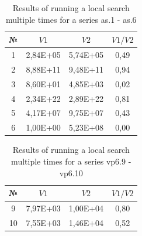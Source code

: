 \documentclass{ifacconf}
\begin{document}
\begin{table}[ht]
	\centering
	\begin{tabular}{|c|c|c|c|}
		\hline
		\hspace*{1.5mm}№\hspace*{0.1mm} &
		\hspace*{1.5cm}$V1$\hspace*{0.1cm}&
		\hspace*{1.5cm}$V2$\hspace*{0.1cm}&
		\hspace*{0.5cm}$V1/V2$\hspace*{0.1cm}\\
		\hline
		1 &  2,84E+05  &  5,74E+05 &   0,49\\
		2 &  8,88E+11  &  9,48E+11 &   0,94\\
		3 &  8,60E+01  &  4,85E+03 &   0,02\\
		4 &  2,34E+22  &  2,89E+22 &   0,81\\
		5 &  4,17E+07  &  9,75E+07 &   0,43\\
		6 &  1,00E+00  &  5,23E+08 &   0,00\\
		\hline
	\end{tabular}
	\caption{Results of running a local search multiple times for a series as.1 - as.6}	\label{spher_as}
\end{table}
\begin{table}[ht]
	\centering
	\begin{tabular}{|c|c|c|c|}
		\hline
		\hspace*{1.5mm}№\hspace*{0.1mm} &
		\hspace*{1.5cm}$V1$\hspace*{0.1cm}&
		\hspace*{1.5cm}$V2$\hspace*{0.1cm}&
		\hspace*{0.5cm}$V1/V2$\hspace*{0.1cm}\\
		\hline
		9  & 7,97E+03  &  1,00E+04  &  0,80\\
		10 & 7,55E+03  &  1,46E+04  &  0,52\\
		\hline
	\end{tabular}
	\caption{Results of running a local search multiple times for a series vp6.9 - vp6.10}	\label{spher_vp6}
\end{table}
\end{document}
